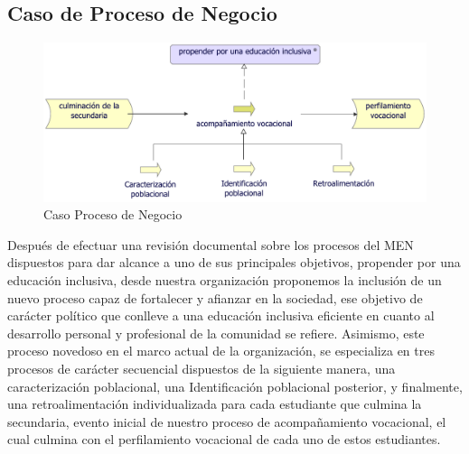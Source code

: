 \subsection{Caso  de Proceso de Negocio}
\begin{figure}[h!]
	\centering
	\includegraphics[width=.9\linewidth]{imgs/caso/negocio/proceso}
	\caption{Caso Proceso de Negocio}
\end{figure}

Después de efectuar una revisión documental sobre los procesos del MEN dispuestos para dar alcance a uno de sus principales objetivos, propender por una educación inclusiva, desde nuestra organización proponemos la inclusión de un nuevo proceso capaz de fortalecer y afianzar en la sociedad, ese objetivo de carácter político que conlleve a una educación inclusiva eficiente en cuanto al desarrollo personal y profesional de la comunidad se refiere. Asimismo, este proceso novedoso en el marco actual de la organización, se especializa en tres procesos de carácter secuencial dispuestos de la siguiente manera, una caracterización poblacional, una Identificación poblacional posterior, y finalmente, una retroalimentación individualizada para cada estudiante que culmina la secundaria, evento inicial de nuestro proceso de acompañamiento vocacional, el cual culmina con el perfilamiento vocacional de cada uno de estos estudiantes.
